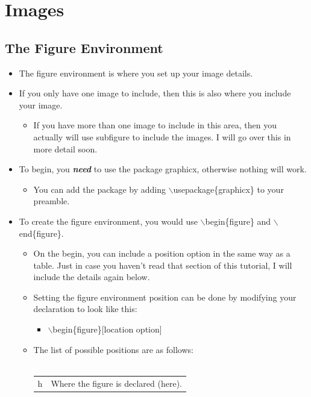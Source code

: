 \section{Images}
	\subsection{The Figure Environment}
		\begin{itemize}
			\item The figure environment is where you set up your image details.
			\item If you only have one image to include, then this is also where you include your image.
			\begin{itemize}
				\item If you have more than one image to include in this area, then you actually will use subfigure to include the images. I will go over this in more detail soon.
			\end{itemize}
			\item To begin, you \textbf{\textit{need}} to use the package graphicx, otherwise nothing will work.
			\begin{itemize}
				\item You can add the package by adding $\backslash$usepackage\{graphicx\} to your preamble.
			\end{itemize}
			\item To create the figure environment, you would use $\backslash$begin\{figure\} and $\backslash$end\{figure\}.
			\begin{itemize}
				\item On the begin, you can include a position option in the same way as a table. Just in case you haven\rq{}t read that section of this tutorial, I will include the details again below.
				\item Setting the figure environment position can be done by modifying your declaration to look like this:
					\begin{itemize}
						\item $\backslash$begin\{figure\}[location option]
					\end{itemize}
				\item The list of possible positions are as follows:\\\\
				\def\arraystretch{1.4}
				\begin{tabularx}{\textwidth}{| l | X |}
					\hline
					h & Where the figure is declared (here).\\

\end{tabularx}
\end{itemize}
\end{itemize}
